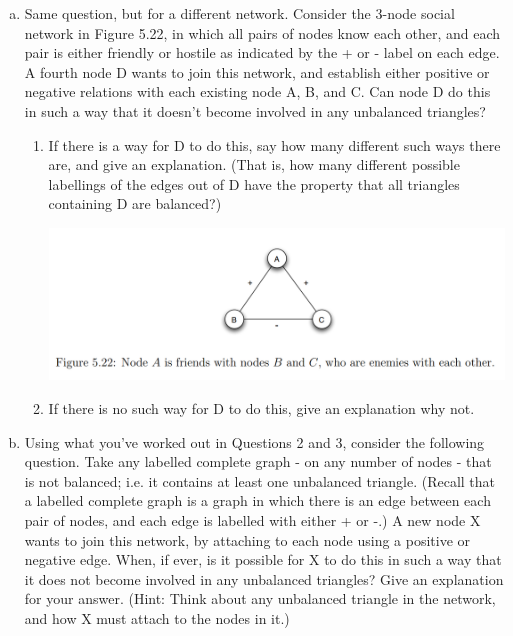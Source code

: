 \documentclass[11pt]{article}
\begin{document}
\begin{enumerate}
\begin{enumerate}[(a)]
		\item Same question, but for a different network. Consider the 3-node social network in Figure 5.22, in which all pairs of nodes know each other, and each pair is either friendly or hostile as indicated by the + or - label on each edge. A fourth node D wants to join this network, and establish either positive or negative relations with each existing node A, B, and C. Can node D do this in such a way that it doesn’t become involved in any unbalanced triangles?
		\begin{enumerate}[*]
			\item  If there is a way for D to do this, say how many different such ways there are, and give an explanation. (That is, how many different possible labellings of the edges out of D have the property that all triangles containing D are balanced?)
			\begin{center}
				\includegraphics[scale=1]{Figure_5_22}\\
			\end{center}
			\item If there is no such way for D to do this, give an explanation why not.
		\end{enumerate}
		\item Using what you’ve worked out in Questions 2 and 3, consider the following question. Take any labelled complete graph - on any number of nodes - that is not balanced; i.e. it contains at least one unbalanced triangle. (Recall that a labelled complete graph is a graph in which there is an edge between each pair of nodes, and each edge is labelled with either + or -.) A new node X wants to join this network, by attaching to each node using a positive or negative edge. When, if ever, is it possible for X to do this in such a way that it does not become involved in any unbalanced triangles? Give an explanation for your answer. (Hint: Think about any unbalanced triangle in the network, and how X must attach to the nodes in it.)
	\end{enumerate}
\end{enumerate}
\end{document}
